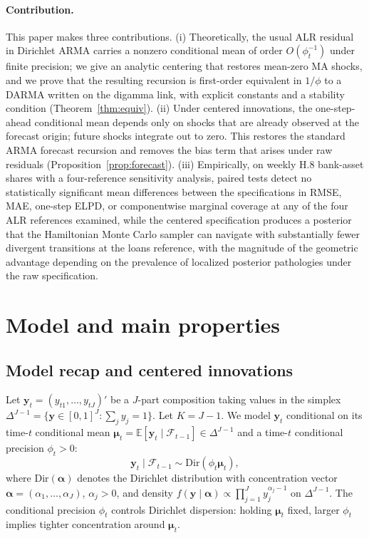 \documentclass[12pt]{article}
\newcommand{\calF}{\mathcal{F}}
\theoremstyle{remark}
\newcommand{\Dir}{\mathrm{Dir}}
\newcommand{\E}{\mathbb{E}}
\newcommand{\bfmu}{\boldsymbol{\mu}}
\newcommand{\bfy}{\mathbf{y}}
\begin{document}
\paragraph{Contribution.}
This paper makes three contributions. (i) Theoretically, the usual ALR residual in Dirichlet ARMA carries a nonzero conditional mean of order $O(\phi_t^{-1})$ under finite precision; we give an analytic centering that restores mean-zero MA shocks, and we prove that the resulting recursion is first-order equivalent in $1/\phi$ to a DARMA written on the digamma link, with explicit constants and a stability condition (Theorem~\ref{thm:equiv}). (ii) Under centered innovations, the one-step-ahead conditional mean depends only on shocks that are already observed at the forecast origin; future shocks integrate out to zero. This restores the standard ARMA forecast recursion and removes the bias term that arises under raw residuals (Proposition~\ref{prop:forecast}). (iii) Empirically, on weekly H.8 bank-asset shares with a four-reference sensitivity analysis, paired tests detect no statistically significant mean differences between the specifications in RMSE, MAE, one-step ELPD, or componentwise marginal coverage at any of the four ALR references examined, while the centered specification produces a posterior that the Hamiltonian Monte Carlo sampler can navigate with substantially fewer divergent transitions at the loans reference, with the magnitude of the geometric advantage depending on the prevalence of localized posterior pathologies under the raw specification.

\section{Model and main properties}
\label{sec:model-theory}

\subsection{Model recap and centered innovations}\label{sec:model}
Let $\bfy_t=(y_{t1},\dots,y_{tJ})'$ be a $J$-part composition taking values in the simplex $\Delta^{J-1}=\{\bfy\in[0,1]^J:\sum_j y_j=1\}$. Let $K=J-1$. We model $\bfy_t$ conditional on its time-$t$ conditional mean $\bfmu_t=\E[\bfy_t\mid\calF_{t-1}]\in\Delta^{J-1}$ and a time-$t$ conditional precision $\phi_t>0$:
\[
\bfy_t \mid \calF_{t-1} \sim \Dir(\phi_t\bfmu_t),
\]
where $\Dir(\boldsymbol{\alpha})$ denotes the Dirichlet distribution with concentration vector $\boldsymbol{\alpha}=(\alpha_1,\ldots,\alpha_J)$, $\alpha_j>0$, and density $f(\bfy\mid\boldsymbol{\alpha})\propto\prod_{j=1}^{J}y_j^{\alpha_j-1}$ on $\Delta^{J-1}$. The conditional precision $\phi_t$ controls Dirichlet dispersion: holding $\bfmu_t$ fixed, larger $\phi_t$ implies tighter concentration around $\bfmu_t$.
\end{document}
